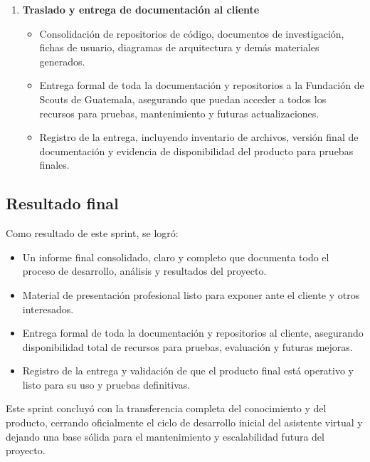 \begin{enumerate}
      \item \textbf{Traslado y entrega de documentación al cliente}
            \begin{itemize}
                  \item Consolidación de repositorios de código, documentos de investigación, fichas de
                        usuario, diagramas de arquitectura y demás materiales generados.
                  \item Entrega formal de toda la documentación y repositorios a la Fundación de Scouts
                        de Guatemala, asegurando que puedan acceder a todos los recursos para pruebas,
                        mantenimiento y futuras actualizaciones.
                  \item Registro de la entrega, incluyendo inventario de archivos, versión final de
                        documentación y evidencia de disponibilidad del producto para pruebas finales.
            \end{itemize}
\end{enumerate}

\subsection{Resultado final}
Como resultado de este sprint, se logró:

\begin{itemize}
      \item Un informe final consolidado, claro y completo que documenta todo el proceso de
            desarrollo, análisis y resultados del proyecto.
      \item Material de presentación profesional listo para exponer ante el cliente y otros
            interesados.
      \item Entrega formal de toda la documentación y repositorios al cliente, asegurando
            disponibilidad total de recursos para pruebas, evaluación y futuras mejoras.
      \item Registro de la entrega y validación de que el producto final está operativo y
            listo para su uso y pruebas definitivas.
\end{itemize}

Este sprint concluyó con la transferencia completa del conocimiento y del
producto, cerrando oficialmente el ciclo de desarrollo inicial del asistente virtual y
dejando una base sólida para el mantenimiento y escalabilidad futura del
proyecto.